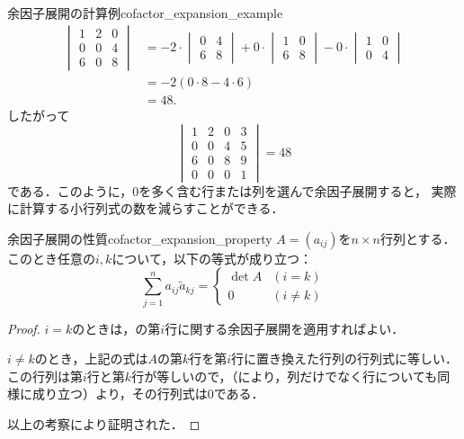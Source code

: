 \begin{example}{余因子展開の計算例}{cofactor_expansion_example}
\begin{align*}
  \begin{vmatrix}
    1 & 2 & 0 \\
    0 & 0 & 4 \\
    6 & 0 & 8
  \end{vmatrix}
  &=
  -2 \cdot
  \begin{vmatrix}
    0 & 4 \\
    6 & 8
  \end{vmatrix}
  +0 \cdot
  \begin{vmatrix}
    1 & 0 \\
    6 & 8
  \end{vmatrix}
  -0 \cdot
  \begin{vmatrix}
    1 & 0 \\
    0 & 4
  \end{vmatrix} \\
  &=
  -2(0 \cdot 8 - 4 \cdot 6) \\
  &= 48.
  \end{align*}
  したがって
  \[
  \begin{vmatrix}
    1 & 2 & 0 & 3 \\
    0 & 0 & 4 & 5 \\
    6 & 0 & 8 & 9 \\
    0 & 0 & 0 & 1
  \end{vmatrix}
  =48
  \]
  である．このように，$0$を多く含む行または列を選んで余因子展開すると，
  実際に計算する小行列式の数を減らすことができる．
\end{example}

\begin{prop}{余因子展開の性質}{cofactor_expansion_property}
  $A = (a_{ij})$を$n \times n$行列とする．このとき任意の$i,k$について，以下の等式が成り立つ：
  \[
  \sum_{j=1}^{n} a_{ij} \tilde{a}_{kj} = \begin{cases} \det A & (i=k) \\ 0 & (i \ne k) \end{cases}
  \]
\end{prop}

\begin{leftbar}
\begin{proof}
  $i=k$のときは，の第$i$行に関する余因子展開を適用すればよい．

$i \ne k$のとき，上記の式は$A$の第$k$行を第$i$行に置き換えた行列の行列式に等しい．この行列は第$i$行と第$k$行が等しいので，（により，列だけでなく行についても同様に成り立つ）より，その行列式は$0$である．

  以上の考察により証明された．
\end{proof}
\end{leftbar}


